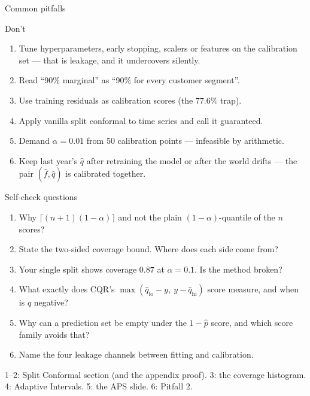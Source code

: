 \documentclass[aspectratio=169,11pt]{beamer}
\begin{document}
\begin{frame}{Common pitfalls}
  \begin{alertblock}{Don't}
    \begin{enumerate}
      \item Tune hyperparameters, early stopping, scalers or features on the
            calibration set --- that is leakage, and it undercovers silently.
      \item Read ``90\% marginal'' as ``90\% for every customer segment''.
      \item Use training residuals as calibration scores (the $77.6\%$ trap).
      \item Apply vanilla split conformal to time series and call it guaranteed.
      \item Demand $\alpha = 0.01$ from 50 calibration points --- infeasible by
            arithmetic.
      \item Keep last year's $\hat q$ after retraining the model or after the world
            drifts --- the pair $(\hat f, \hat q)$ is calibrated together.
    \end{enumerate}
  \end{alertblock}
\end{frame}

\begin{frame}{Self-check questions}
  \footnotesize
  \begin{readme}
    \begin{enumerate}
      \item Why $\lceil (n+1)(1-\alpha) \rceil$ and not the plain
            $(1-\alpha)$-quantile of the $n$ scores?
      \item State the two-sided coverage bound. Where does each side come from?
      \item Your single split shows coverage $0.87$ at $\alpha = 0.1$. Is the method
            broken?
      \item What exactly does CQR's $\max(\hat q_{\text{lo}} - y,\
            y - \hat q_{\text{hi}})$ score measure, and when is $\hat q$ negative?
      \item Why can a prediction set be empty under the $1 - \hat p$ score, and
            which score family avoids that?
      \item Name the four leakage channels between fitting and calibration.
    \end{enumerate}
  \end{readme}
  \begin{takeaway}
    1--2: Split Conformal section (and the appendix proof). 3: the coverage
    histogram. 4: Adaptive Intervals. 5: the APS slide. 6: Pitfall 2.
  \end{takeaway}
\end{frame}
\end{document}
